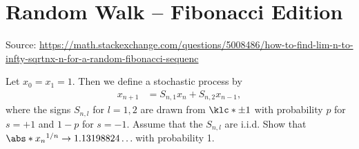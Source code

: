 \documentclass[english, parskip=full]{scrartcl}
\title{\Title}
\author{\Author}
\date{\today}
\begin{document}
\maketitle  %

\section{Random Walk -- Fibonacci Edition}
Source: \url{https://math.stackexchange.com/questions/5008486/how-to-find-lim-n-to-infty-sqrtnx-n-for-a-random-fibonacci-sequenc}

Let $x_0=x_1=1$.
Then we define a stochastic process by
\begin{align}
x_{n+1} &= S_{n,1} x_n + S_{n,2} x_{n-1},
\end{align}
where the signs $S_{n,l}$ for $l=1,2$ are drawn from $\klc*{\pm 1}$ with probability $p$ for $s=+1$ and $1-p$ for $s=-1$.
Assume that the $S_{n,l}$ are i.i.d.
Show that $\abs*{x_n}^{1/n} \rightarrow 1.13198824\dots$with probability 1.
\end{document}
